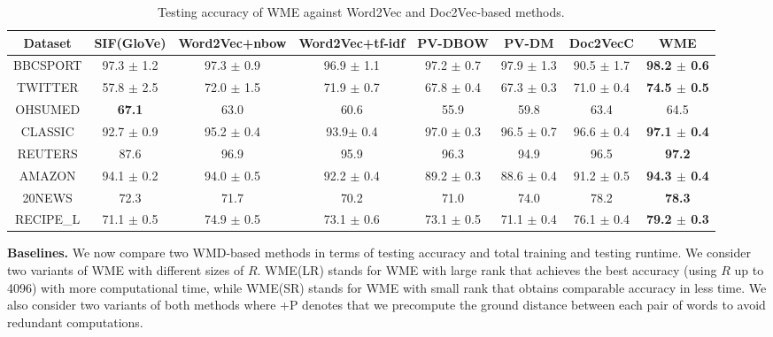 \documentclass[11pt,a4paper]{article}
\newcommand{\1}{\boldsymbol{1}}
\begin{document}
\begin{table}[ht]
\centering
\scriptsize
\caption{Testing accuracy of WME against Word2Vec and Doc2Vec-based methods.}
\vspace{0mm}
\label{tb:comp_word2vec}
\newcommand{\Bd}[1]{\textbf{#1}}
\begin{center}
    \begin{tabular}{ c c c c c c c c}
    \hline
    Dataset & SIF(GloVe) & Word2Vec+nbow & Word2Vec+tf-idf & PV-DBOW & PV-DM & Doc2VecC & WME \\ \hline 
    BBCSPORT  & 97.3 $\pm$ 1.2 & 97.3 $\pm$ 0.9 & 96.9 $\pm$ 1.1 & 97.2 $\pm$ 0.7 & 97.9 $\pm$ 1.3  & 90.5 $\pm$ 1.7 & \Bd{98.2 $\pm$ 0.6} \\ 
    TWITTER  & 57.8  $\pm$ 2.5 & 72.0 $\pm$ 1.5 & 71.9 $\pm$ 0.7 & 67.8 $\pm$ 0.4 & 67.3 $\pm$ 0.3  & 71.0 $\pm$ 0.4 & \Bd{74.5 $\pm$ 0.5} \\ 
    OHSUMED & \Bd{67.1} & 63.0 & 60.6 & 55.9 & 59.8 & 63.4 & 64.5 \\ 
    CLASSIC & 92.7 $\pm$ 0.9 & 95.2 $\pm$ 0.4 & 93.9$\pm$ 0.4 & 97.0 $\pm$ 0.3 & 96.5 $\pm$ 0.7  & 96.6 $\pm$ 0.4  & \Bd{97.1 $\pm$ 0.4} \\
    REUTERS & 87.6 & 96.9 & 95.9 & 96.3 & 94.9  & 96.5 & \Bd{97.2} \\ 
    AMAZON & 94.1 $\pm$ 0.2 & 94.0 $\pm$ 0.5 & 92.2 $\pm$ 0.4 & 89.2 $\pm$ 0.3 & 88.6 $\pm$ 0.4  & 91.2 $\pm$ 0.5 & \Bd{94.3 $\pm$ 0.4} \\ 
    20NEWS & 72.3 & 71.7  & 70.2  & 71.0 & 74.0 & 78.2 & \Bd{78.3} \\ 
    RECIPE\_L  & 71.1 $\pm$ 0.5 & 74.9 $\pm$ 0.5 & 73.1 $\pm$ 0.6 & 73.1 $\pm$ 0.5 & 71.1 $\pm$ 0.4  & 76.1 $\pm$ 0.4  & \Bd{79.2 $\pm$ 0.3} \\ \hline
    \end{tabular}
\end{center}
\vspace{0mm}
\end{table}

\vskip0.05in
\noindent
\textbf{Baselines.} We now compare two WMD-based methods in terms of testing accuracy and total training and testing runtime. 
We consider two variants of WME with different sizes of $R$. WME(LR) stands for WME with large rank that achieves the best accuracy (using $R$ up to 4096) with more computational time, while WME(SR) stands for WME with small rank that obtains comparable accuracy in less time. We also consider two variants of both methods where +P denotes that we precompute the ground distance between each pair of words to avoid redundant computations. 
\end{document}
